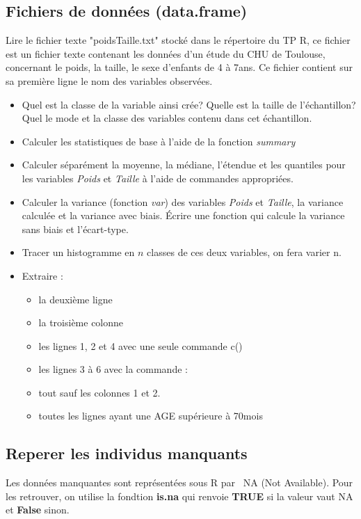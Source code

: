 \documentclass[12pt,twoside,openright]{article}
\begin{document}
\subsection{Fichiers de données (data.frame)}
Lire le fichier texte "poidsTaille.txt" stocké dans le répertoire du TP R, ce fichier est un fichier texte contenant les données d'un étude du CHU de Toulouse, concernant le poids, la taille, le sexe d'enfants de 4 à 7ans. Ce fichier contient sur sa première ligne le nom des variables observées.
	\begin{itemize}
	\item Quel est la classe de la variable ainsi crée? Quelle est la taille de l'échantillon? Quel le mode et la classe des variables contenu dans cet échantillon.
	\item Calculer les statistiques de base à l'aide de la fonction \emph{summary}
	\item Calculer séparément la moyenne, la médiane, l’étendue et les quantiles pour les variables \emph{Poids} et \emph{Taille} à l’aide de commandes appropriées.
	\item Calculer la variance (fonction \emph{var}) des  variables \emph{Poids} et \emph{Taille}, la variance calculée et la variance avec biais. \'Ecrire une fonction qui calcule la variance sans biais et l'écart-type.
	\item Tracer un histogramme en $n$ classes de ces deux variables, on fera varier n.
	\item Extraire :
		\begin{itemize}
		\item la deuxième ligne
		\item la troisième colonne
		\item les lignes 1, 2 et 4 avec une seule commande c()
		\item les lignes 3 à 6 avec la commande :
		\item tout sauf les colonnes 1 et 2.
		\item toutes les lignes ayant une AGE supérieure à 70mois
		\end{itemize}
		\end{itemize}
\subsection{Reperer les individus manquants}
Les données manquantes sont représentées sous R par {\ NA} (Not Available). Pour les retrouver, on utilise la fondtion {\bf is.na} qui renvoie {\bf TRUE} si la valeur vaut NA et {\bf False} sinon. \\
\end{document}
